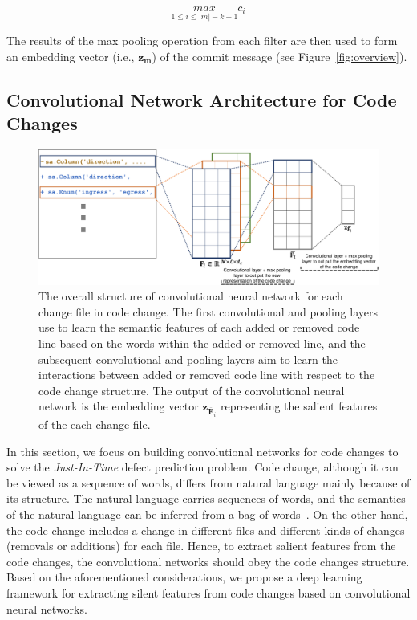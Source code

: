 \begin{equation}
\label{eq:max_pooling_msg}
\underset{1 \leq i \leq |m| - k + 1}{max} c_i
\end{equation}

The results of the max pooling operation from each filter are then used to form an embedding vector (i.e., $\textbf{z}_\textbf{m}$) of the commit message (see Figure~\ref{fig:overview}). 

\subsection{Convolutional Network Architecture for Code Changes}
\label{sec:cnn_code}

\begin{figure}
	\center
	\includegraphics[scale=0.25]{figs/code_framework.pdf}
	\caption{The overall structure of convolutional neural network for each change file in code change. The first convolutional and pooling layers use to learn the semantic features of each added or removed code line based on the words within the added or removed line, and the subsequent convolutional and pooling layers aim to learn the interactions between added or removed code line with respect to the code change structure. The output of the convolutional neural network is the embedding vector $\textbf{z}_{\overline{\textbf{F}}_{i}}$ representing the salient features of the each change file.}
	\label{fig:code}
\end{figure}

In this section, we focus on building convolutional networks for code changes to solve the \emph{Just-In-Time} defect prediction problem. 
Code change, although it can be viewed as a sequence of words, differs from natural language mainly because of its structure. The natural language carries sequences of words, and the semantics of the natural language can be inferred from a bag of words~\cite{ng1997corpus}. On the other hand, the code change includes a change in different files and different kinds of changes (removals or additions) for each file. Hence, to extract salient features from the code changes, the convolutional networks should obey the code changes structure. 
Based on the aforementioned considerations, we propose a deep learning framework for extracting silent features from code changes based on convolutional neural networks. 

